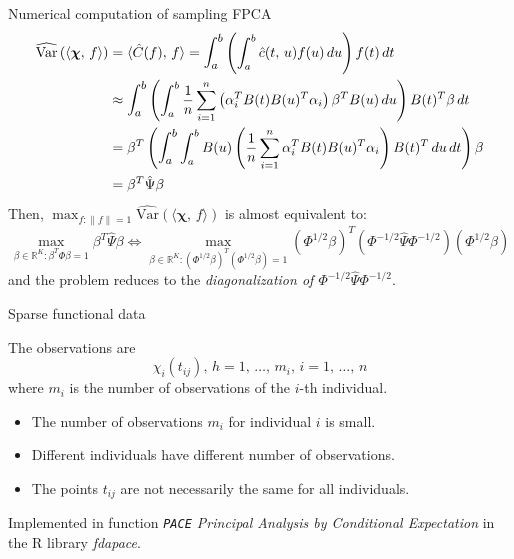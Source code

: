 \begin{algorithm}{Numerical computation of sampling FPCA}{}
    \begin{align*}
        \widehat{\text{Var}} \left( \langle \boldsymbol \chi,\, f \rangle \right)
        &= \langle\hat C(f),\, f \rangle
        = \mathlarger{\int_a^b} \left( \int_a^b \hat c(t,\,u) f(u) \,du \right)f(t) \,dt \\
        &\approx \mathlarger{\int_a^b} \left( \int_a^b \frac{1}{n} \sum_{i=1}^n \left(
            \alpha_i^T B(t) B(u)^T \alpha_i
        \right) \beta^T B(u) \,du \right) B(t)^T \beta \,dt \\
        &= \beta^T \left(\mathlarger{ \int_a^b }
        \int_a^b B(u) \left(
            \frac{1}{n} \sum_{i=1}^n \alpha_i^T B(t) B(u)^T \alpha_i
        \right) B(t)^T \,du \,dt \right) \beta \\
        &= \beta^T \hat \Psi \beta
    \end{align*}
    Then, $\max_{f:\lVert f \rVert = 1} \widehat{\text{Var}} \left( \langle \boldsymbol \chi,\, f \rangle \right)$
    is almost equivalent to:
    \begin{equation*}
        \max_{\beta\in\mathds R^K : \beta^T\Phi\beta = 1} \beta^T \hat \Psi \beta
        \iff
        \max_{\beta\in\mathds R^K : \left( \Phi^{1/2}\beta \right)^T \left( \Phi^{1/2}\beta \right) = 1}
            \left( \Phi^{1/2}\beta \right)^T
            \left( \Phi^{-1/2} \hat \Psi \Phi^{-1/2} \right)
            \left( \Phi^{1/2}\beta \right)
    \end{equation*}
    and the problem reduces to the \emph{diagonalization of $\Phi^{-1/2} \hat \Psi \Phi^{-1/2}$}.
\end{algorithm}

\begin{definition}{Sparse functional data}{}

    The observations are
    \begin{equation*}
        \chi_i(t_{ij}),\, h=1,\, \dots,\, m_i,\, i=1,\, \dots,\, n
    \end{equation*}
    where $m_i$ is the number of observations of the $i$-th individual.
    \begin{itemize}
        \item The number of observations $m_i$ for individual $i$ is small.
        \item Different individuals have different number of observations.
        \item The points $t_{ij}$ are not necessarily the same for all individuals.
    \end{itemize}

    Implemented in function \emph{\texttt{PACE} Principal Analysis by Conditional
    Expectation} in the R library \emph{fdapace}.
\end{definition}

